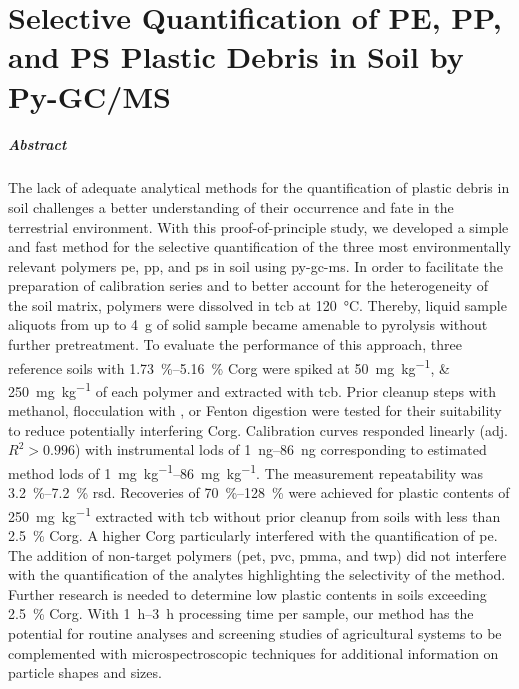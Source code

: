 
\chapter{Selective Quantification of PE, PP, and PS Plastic Debris in Soil by Py-GC/MS}
\label{ch:py-gc-ms-method}

\paragraph{Abstract} The lack of adequate analytical methods for the quantification of plastic debris in soil challenges a better understanding of their occurrence and fate in the terrestrial environment.
With this proof-of-principle study, we developed a simple and fast method for the selective quantification of the three most environmentally relevant polymers \ac{pe}, \ac{pp}, and \ac{ps} in soil using \ac{py-gc-ms}.
In order to facilitate the preparation of calibration series and to better account for the heterogeneity of the soil matrix, polymers were dissolved in \ac{tcb} at \SI{120}{\degreeCelsius}. Thereby, liquid sample aliquots from up to \SI{4}{\gram} of solid sample became amenable to pyrolysis without further pretreatment. To evaluate the performance of this approach, three reference soils with \SIrange{1.73}{5.16}{\percent} \ac{Corg} were spiked at \SIlist{50;250}{\milli\gram\per\kilo\gram} of each polymer and extracted with \ac{tcb}. Prior cleanup steps with methanol, flocculation with , or Fenton digestion were tested for their suitability to reduce potentially interfering \ac{Corg}.
Calibration curves responded linearly (adj. $R^2 > 0.996$) with instrumental \acp{lod} of \SIrange{1}{86}{\nano\gram} corresponding to estimated method \acp{lod} of \SIrange{1}{86}{\milli\gram\per\kilo\gram}. The measurement repeatability was \SIrange{3.2}{7.2}{\percent} \ac{rsd}. Recoveries of \SIrange{70}{128}{\percent} were achieved for plastic contents of \SI{250}{\milli\gram\per\kilo\gram} extracted with \ac{tcb} without prior cleanup from soils with less than \SI{2.5}{\percent} \ac{Corg}. A higher \ac{Corg} particularly interfered with the quantification of \ac{pe}. The addition of non-target polymers (\ac{pet}, \ac{pvc}, \ac{pmma}, and \ac{twp}) did not interfere with the quantification of the analytes highlighting the selectivity of the method. Further research is needed to determine low plastic contents in soils exceeding \SI{2.5}{\percent} \ac{Corg}. With \SIrange{1}{3}{\hour} processing time per sample, our method has the potential for routine analyses and screening studies of agricultural systems to be complemented with microspectroscopic techniques for additional information on particle shapes and sizes.

